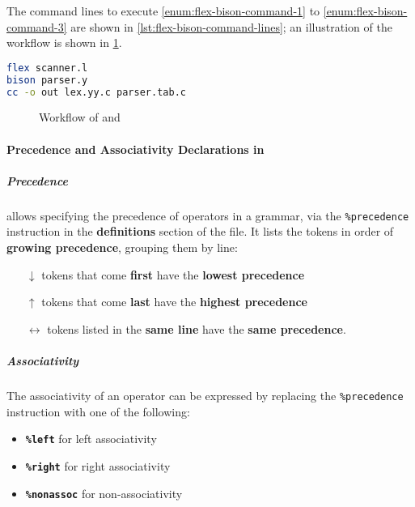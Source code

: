 \documentclass[english]{article}
\begin{document}
The command lines to execute \ref{enum:flex-bison-command-1} to \ref{enum:flex-bison-command-3} are shown in \ref{lst:flex-bison-command-lines}; an illustration of the workflow is shown in \ref{fig:flex-bison-workflow}.

\begin{lstlisting}[language=bash, caption={Command lines to execute \ref{enum:flex-bison-command-1} to \ref{enum:flex-bison-command-3}}, label={lst:flex-bison-command-lines}]
flex scanner.l
bison parser.y
cc -o out lex.yy.c parser.tab.c
\end{lstlisting}

\begin{figure}[htbp]
  \centering
  \bigskip
  \caption{Workflow of \flex and \bison}
  \label{fig:flex-bison-workflow}
  \bigskip
\end{figure}

\paragraph{Precedence and Associativity Declarations in \bison}

\subparagraph*{Precedence}
\bison allows specifying the precedence of operators in a grammar, via the \texttt{\%precedence} instruction in the \textbf{definitions} section of the file.
It lists the tokens in order of \textbf{growing precedence}, grouping them by line:

\begin{itemize}
  \item[\(\downarrow\)] tokens that come \textbf{first} have the \textbf{lowest precedence}
  \item[\(\uparrow\)] tokens that come \textbf{last} have the \textbf{highest precedence}
  \item[\(\leftrightarrow\)] tokens listed in the \textbf{same line} have the \textbf{same precedence}.
\end{itemize}

\subparagraph*{Associativity}
The associativity of an operator can be expressed by replacing the \texttt{\%precedence} instruction with one of the following:

\begin{itemize}[label=\texttt{>}]
  \item \textbf{\texttt{\%left}} for left associativity
  \item \textbf{\texttt{\%right}} for right associativity
  \item \textbf{\texttt{\%nonassoc}} for non-associativity
\end{itemize}
\end{document}
